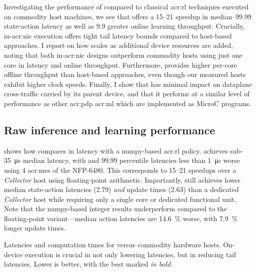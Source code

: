 Investigating the performance of \approachshort{} compared to classical \gls{acr:rl} techniques executed on commodity host machines, we see that \Coopfw{} offers a \qtyrange{15}{21}{\times} speedup in median--\num{99.99} state-action latency as well as \qty{9.9}{\times} greater online learning throughput.
Crucially, in-\gls{acr:nic} execution offers tight tail latency bounds compared to host-based approaches.
I report on how \approachshort{} scales as additional device resources are added, noting that both in-\gls{acr:nic} designs outperform commodity hosts using just one core in latency and online throughput.
Furthermore, \Indfw{} provides higher per-core offline throughput than host-based approaches, even though our measured hosts exhibit higher clock speeds.
Finally, I show that \approachshort{} has minimal impact on dataplane cross-traffic carried by its parent device, and that it performs at a similar level of performance as other \gls{acr:pdp} \gls{acr:ml} which are implemented as MicroC programs.

\subsection{Raw inference and learning performance}\label{sec:opal-results-inference}
 shows how \approachshort{} compares in latency with a numpy-based \gls{acr:rl} policy.
\Coopfw{} achieves sub-\qty{35}{\micro\second} median latency, with  and \num{99.99} percentile latencies less than \qty{1}{\micro\second} worse using 4 \glspl{acr:me} of the NFP-6480.
This corresponds to \qtyrange{15}{21}{\times} speedups over a \emph{Collector} host using floating-point arithmetic.
Importantly, \Indfw{} still achieves lower median state-action latencies (\qty{2.79}{\times}) \emph{and} update times (\qty{2.63}{\times}) than a dedicated \emph{Collector} host while requiring only a single core or dedicated functional unit.
Note that the numpy-based integer results underperform compared to the floating-point variant---median action latencies are \qty{14.6}{\percent} worse, with \qty{7.9}{\percent} longer update times.

\newlength{\resultplotwidth}
\setlength{\resultplotwidth}{\linewidth}

\begin{table}
	\caption[Latencies and computation times for \approachshort{} versus commodity hardware hosts.]{Latencies and computation times for \approachshort{} versus commodity hardware hosts. On-device execution is crucial in not only lowering latencies, but in reducing tail latencies. Lower is better, with the best marked \emph{in bold}.\label{tab:lats}}
\end{table}

